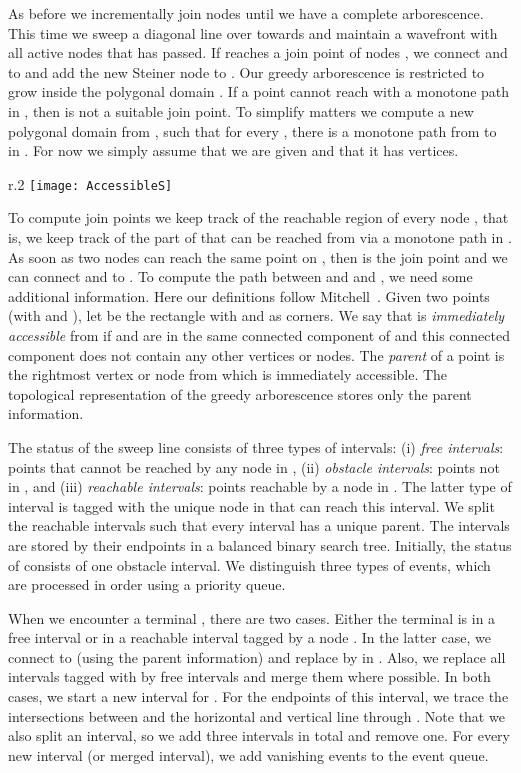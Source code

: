 \documentclass{journalA4}
\begin{document}
As before we incrementally join nodes until we have a complete arborescence. This time we sweep a diagonal line  over  towards  and maintain a wavefront  with all active nodes that  has passed. If  reaches a join point  of nodes , we connect  and  to  and add the new Steiner node to . Our greedy arborescence is restricted to grow inside the polygonal domain . If a point  cannot reach  with a monotone path in , then  is not a suitable join point. To simplify matters we compute a new polygonal domain  from , such that for every , there is a monotone path from  to  in . For now we simply assume that we are given  and that it has  vertices.

\begin{wrapfigure}[6]{r}{.2\textwidth}
  \centering
  \texttt{[image: AccessibleS]}
\end{wrapfigure}
To compute join points we keep track of the reachable region of every node , that is, we keep track of the part of  that can be reached from  via a monotone path in . As soon as two nodes  can reach the same point  on , then  is the join point  and we can connect  and  to . To compute the path between  and  and , we need some additional information. Here our definitions follow Mitchell~\cite{Mitchell92}. Given two points  (with 
and ), let  be the rectangle with  and  as corners. We say that  is \emph{immediately accessible} from  if 
and  are in the same connected component of  and this connected component does not
contain any other vertices or nodes. The \emph{parent} of a point 
is the rightmost vertex or node from which  is immediately accessible.
The topological representation of the greedy arborescence stores only the parent information.


The status of the sweep line  consists of three types of intervals: (i) \emph{free intervals}: points that cannot be reached by any node in
, (ii) \emph{obstacle intervals}: points not in , and (iii) \emph{reachable intervals}: points reachable by a node in . The latter type of interval is tagged with the unique node in  that can reach this interval. We split the reachable intervals such that every interval has a
unique parent. The intervals are stored by their endpoints in a balanced binary search tree. Initially, the status of  consists of one obstacle interval. We distinguish three types of events, which are processed in order using a priority queue.

 When we encounter a terminal , there are two cases. Either the terminal is in a free interval or in a reachable interval tagged by a node . In the latter case, we connect  to  (using the parent information) and replace  by  in . Also, we replace all intervals tagged with  by free intervals and merge them where possible. In both cases, we start a new interval for . For the endpoints of this interval, we trace the intersections between  and the horizontal and vertical line through . Note that we also split an interval, so we add three intervals in total and remove one. For every new interval (or merged interval), we add vanishing events to the event queue.
\end{document}
